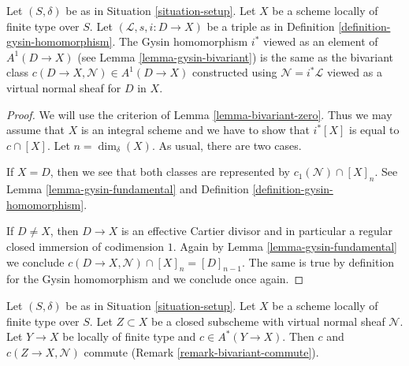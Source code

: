 \begin{lemma}
\label{lemma-gysin-agrees}
Let $(S, \delta)$ be as in Situation \ref{situation-setup}. Let $X$ be a scheme
locally of finite type over $S$. Let $(\mathcal{L}, s, i : D \to X)$
be a triple as in Definition \ref{definition-gysin-homomorphism}.
The Gysin homomorphism $i^*$ viewed as an element of $A^1(D \to X)$
(see Lemma \ref{lemma-gysin-bivariant}) is the same as the bivariant class
$c(D \to X, \mathcal{N}) \in A^1(D \to X)$
constructed using $\mathcal{N} = i^*\mathcal{L}$
viewed as a virtual normal sheaf for $D$ in $X$.
\end{lemma}

\begin{proof}
We will use the criterion of Lemma \ref{lemma-bivariant-zero}.
Thus we may assume that $X$ is an integral scheme and
we have to show that $i^*[X]$ is equal to $c \cap [X]$.
Let $n = \dim_\delta(X)$. As usual, there are two cases.

\medskip\noindent
If $X = D$, then we see that both classes are represented by
$c_1(\mathcal{N}) \cap [X]_n$. See Lemma \ref{lemma-gysin-fundamental}
and Definition \ref{definition-gysin-homomorphism}.

\medskip\noindent
If $D \not = X$, then $D \to X$ is an effective Cartier divisor
and in particular a regular closed immersion of codimension $1$.
Again by Lemma \ref{lemma-gysin-fundamental} we conclude
$c(D \to X, \mathcal{N}) \cap [X]_n = [D]_{n - 1}$. The same
is true by definition for the Gysin homomorphism and we conclude
once again.
\end{proof}

\begin{lemma}
\label{lemma-gysin-commutes}
Let $(S, \delta)$ be as in Situation \ref{situation-setup}. Let $X$ be a scheme
locally of finite type over $S$. Let $Z \subset X$ be a closed subscheme
with virtual normal sheaf $\mathcal{N}$. Let $Y \to X$ be locally of
finite type and $c \in A^*(Y \to X)$. Then $c$ and $c(Z \to X, \mathcal{N})$
commute (Remark \ref{remark-bivariant-commute}).
\end{lemma}

